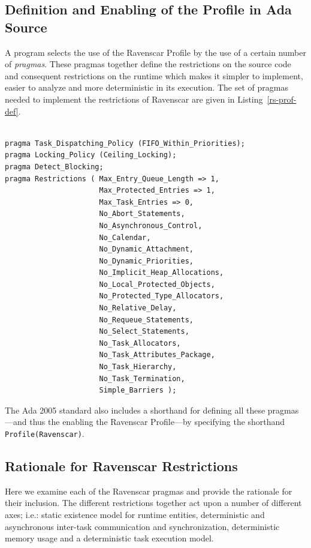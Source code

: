 \subsection{Definition and Enabling of the Profile in Ada Source}

A program selects the use of the Ravenscar Profile by the use of a
certain number of \emph{pragmas}. These pragmas together define the
restrictions on the source code and consequent restrictions on the
runtime which makes it simpler to implement, easier to analyze and
more deterministic in its execution. The set of pragmas needed to
implement the restrictions of Ravenscar are given in
Listing~\ref{rs-prof-def}.

\begin{minipage}{\listingwidth}
\begin{lstlisting}[label=rs-prof-def, caption=The Ada 95/2005 pragmas
    needed to enable the Ravenscar Profile]

pragma Task_Dispatching_Policy (FIFO_Within_Priorities);
pragma Locking_Policy (Ceiling_Locking);
pragma Detect_Blocking;
pragma Restrictions ( Max_Entry_Queue_Length => 1,
                      Max_Protected_Entries => 1,
                      Max_Task_Entries => 0,
                      No_Abort_Statements,
                      No_Asynchronous_Control,
                      No_Calendar,
                      No_Dynamic_Attachment,
                      No_Dynamic_Priorities,
                      No_Implicit_Heap_Allocations,
                      No_Local_Protected_Objects,
                      No_Protected_Type_Allocators,
                      No_Relative_Delay,
                      No_Requeue_Statements,
                      No_Select_Statements,
                      No_Task_Allocators,
                      No_Task_Attributes_Package,
                      No_Task_Hierarchy,
                      No_Task_Termination,
                      Simple_Barriers );
\end{lstlisting}
\end{minipage}

The Ada 2005 standard also includes a shorthand for defining all these
pragmas---and thus the enabling the Ravenscar Profile---by specifying
the shorthand  \texttt{Profile(Ravenscar)}.

\subsection{Rationale for Ravenscar Restrictions}
Here we examine each of the Ravenscar pragmas and provide the
rationale for their inclusion. The different restrictions together act
upon a number of different axes; i.e.: static existence model for
runtime entities, deterministic and asynchronous inter-task
communication and synchronization, deterministic memory usage and a
deterministic task execution model.

